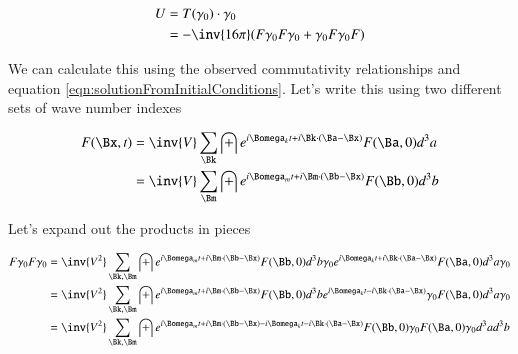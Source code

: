 \documentclass{article}
\begin{document}
\begin{align*}
U 
&= T(\gamma_0) \cdot \gamma_0 \\
&= -\inv{16 \pi} ( F \gamma_0 F \gamma_0 + \gamma_0 F \gamma_0 F )
\end{align*}

We can calculate this using the
observed commutativity relationships and equation
\ref{eqn:solutionFromInitialConditions}.  Let's write this using two different 
sets of wave number indexes

\begin{align*}
F(\Bx,t) 
&= \inv{V} \sum_{\Bk} \int e^{i \Bomega_k t + i \Bk \cdot (\Ba-\Bx) } F(\Ba, 0) d^3 a \\
&= \inv{V} \sum_{\Bm} \int e^{i \Bomega_m t + i \Bm \cdot (\Bb-\Bx) } F(\Bb, 0) d^3 b 
\end{align*}

Let's expand out the products in pieces 

\begin{align*}
F \gamma_0 F \gamma_0 
&=
\inv{V^2} \sum_{\Bk,\Bm} 
\int e^{i \Bomega_m t + i \Bm \cdot (\Bb-\Bx) } F(\Bb, 0) d^3 b \gamma_0
e^{i \Bomega_k t + i \Bk \cdot (\Ba-\Bx) } F(\Ba, 0) d^3 a \gamma_0 \\
&=
\inv{V^2} \sum_{\Bk,\Bm} 
\int e^{i \Bomega_m t + i \Bm \cdot (\Bb-\Bx) } F(\Bb, 0) d^3 b 
e^{i \Bomega_k t - i \Bk \cdot (\Ba-\Bx) } \gamma_0 F(\Ba, 0) d^3 a \gamma_0 \\
&=
\inv{V^2} \sum_{\Bk,\Bm} 
\int e^{i \Bomega_m t + i \Bm \cdot (\Bb-\Bx) -i \Bomega_k t - i \Bk \cdot (\Ba-\Bx) } F(\Bb, 0) \gamma_0 F(\Ba, 0) \gamma_0 d^3 a d^3 b \\
\end{align*}
\end{document}
